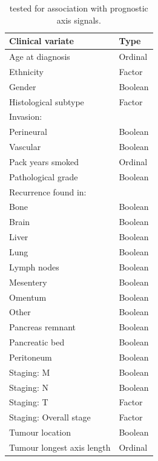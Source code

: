 \documentclass[dissertation.tex]{subfiles}
\begin{document}
\begin{table}[h]
\centering
\caption{ tested for association with prognostic axis signals.}\label{tab:sigs-clinvar-table}
\begin{tabular}{@{}ll@{}}
\toprule
Clinical variate           & Type    \\ \midrule
Age at diagnosis           & Ordinal \\
Ethnicity                  & Factor  \\
Gender                     & Boolean \\
Histological subtype       & Factor  \\
Invasion:                  &         \\
\quad Perineural           & Boolean \\
\quad Vascular             & Boolean \\
Pack years smoked          & Ordinal \\
Pathological grade         & Boolean \\
Recurrence found in:           &         \\
\quad Bone                       & Boolean \\
\quad Brain                      & Boolean \\
\quad Liver                      & Boolean \\
\quad Lung                       & Boolean \\
\quad Lymph nodes                & Boolean \\
\quad Mesentery                  & Boolean \\
\quad Omentum                    & Boolean \\
\quad Other                      & Boolean \\
\quad Pancreas remnant           & Boolean \\
\quad Pancreatic bed             & Boolean \\
\quad Peritoneum                 & Boolean \\
Staging: M                 & Boolean \\
Staging: N                 & Boolean \\
Staging: T                 & Factor  \\
Staging: Overall stage     & Factor  \\
Tumour location            & Boolean \\
Tumour longest axis length & Ordinal \\
\bottomrule
\end{tabular}
\end{table}
\end{document}
